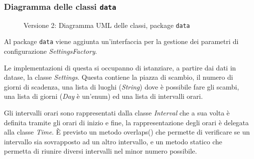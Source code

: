 \subsubsection{Diagramma delle classi \texttt{data}}
\vspace{0.5cm}
\begin{figure}[H]
    \centering
    \caption{Versione 2: Diagramma UML delle classi, package \texttt{data}}
    \label{fig:class_data_v_2}
\end{figure}

Al package \texttt{data} viene aggiunta un'interfaccia per la gestione dei parametri di configurazione \textit{SettingsFactory}.

Le implementazioni di questa si occupanno di istanziare, a partire dai dati in datase, la classe \textit{Settings}.
Questa contiene la piazza di scambio, il numero di giorni di scadenza, una lista di luoghi (\textit{String}) dove è possibile fare gli scambi,
una lista di giorni (\textit{Day} è un'enum) ed una lista di intervalli orari.

Gli intervalli orari sono rappresentati dalla classe \textit{Interval} che a sua volta è definita tramite gli orari di inizio e fine, la rappresentazione
degli orari è delegata alla classe \textit{Time}. È previsto un metodo overlaps() che permette di verificare se un intervallo sia sovrapposto
ad un altro intervallo, e un metodo statico che permetta di riunire diversi intervalli nel minor numero possibile.
